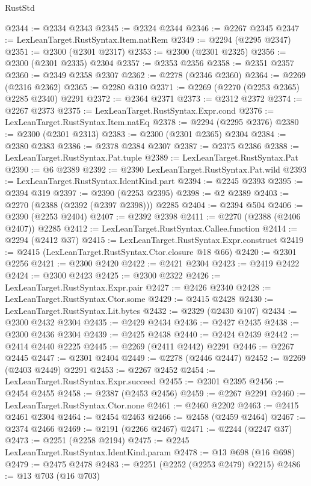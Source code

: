 \begin{lexlean}{RustStd}
\begin{coremodule}
{\begin{coremodule}
{{{{{{{{{{{{@2344 := @2334 @2343
@2345 := @2324 @2344
@2346 := @2267 @2345
@2347 := LexLeanTarget.RustSyntax.Item.natRem
@2349 := @2294 (@2295 @2347)
@2351 := @2300 (@2301 @2317)
@2353 := @2300 (@2301 @2325)
@2356 := @2300 (@2301 @2335) @2304
@2357 := @2353 @2356
@2358 := @2351 @2357
@2360 := @2349 @2358 @2307
@2362 := @2278 (@2346 @2360)
@2364 := @2269 (@2316 @2362)
@2365 := @2280 @310
@2371 := @2269 (@2270 (@2253 @2365) @2285 @2340) @2291
@2372 := @2364 @2371
@2373 := @2312 @2372
@2374 := @2267 @2373
@2375 := LexLeanTarget.RustSyntax.Expr.cond
@2376 := LexLeanTarget.RustSyntax.Item.natEq
@2378 := @2294 (@2295 @2376)
@2380 := @2300 (@2301 @2313)
@2383 := @2300 (@2301 @2365) @2304
@2384 := @2380 @2383
@2386 := @2378 @2384 @2307
@2387 := @2375 @2386
@2388 := LexLeanTarget.RustSyntax.Pat.tuple
@2389 := LexLeanTarget.RustSyntax.Pat
@2390 := @6 @2389
@2392 := @2390 LexLeanTarget.RustSyntax.Pat.wild
@2393 := LexLeanTarget.RustSyntax.IdentKind.part
@2394 := @2245 @2393
@2395 := @2394 @319
@2397 := @2390 (@2253 @2395)
@2398 := @2 @2389
@2403 := @2270 (@2388 (@2392 (@2397 @2398))) @2285
@2404 := @2394 @504
@2406 := @2390 (@2253 @2404)
@2407 := @2392 @2398
@2411 := @2270 (@2388 (@2406 @2407)) @2285
@2412 := LexLeanTarget.RustSyntax.Callee.function
@2414 := @2294 (@2412 @37)
@2415 := LexLeanTarget.RustSyntax.Expr.construct
@2419 := @2415 (LexLeanTarget.RustSyntax.Ctor.closure @18 @66)
@2420 := @2301 @2256
@2421 := @2300 @2420
@2422 := @2421 @2304
@2423 := @2419 @2422
@2424 := @2300 @2423
@2425 := @2300 @2322
@2426 := LexLeanTarget.RustSyntax.Expr.pair
@2427 := @2426 @2340
@2428 := LexLeanTarget.RustSyntax.Ctor.some
@2429 := @2415 @2428
@2430 := LexLeanTarget.RustSyntax.Lit.bytes
@2432 := @2329 (@2430 @107)
@2434 := @2300 @2432 @2304
@2435 := @2429 @2434
@2436 := @2427 @2435
@2438 := @2300 @2436 @2304
@2439 := @2425 @2438
@2440 := @2424 @2439
@2442 := @2414 @2440 @2225
@2445 := @2269 (@2411 @2442) @2291
@2446 := @2267 @2445
@2447 := @2301 @2404
@2449 := @2278 (@2446 @2447)
@2452 := @2269 (@2403 @2449) @2291
@2453 := @2267 @2452
@2454 := LexLeanTarget.RustSyntax.Expr.succeed
@2455 := @2301 @2395
@2456 := @2454 @2455
@2458 := @2387 (@2453 @2456)
@2459 := @2267 @2291
@2460 := LexLeanTarget.RustSyntax.Ctor.none
@2461 := @2460 @2202
@2463 := @2415 @2461 @2304
@2464 := @2454 @2463
@2466 := @2458 (@2459 @2464)
@2467 := @2374 @2466
@2469 := @2191 (@2266 @2467)
@2471 := @2244 (@2247 @37)
@2473 := @2251 (@2258 @2194)
@2475 := @2245 LexLeanTarget.RustSyntax.IdentKind.param
@2478 := @13 @698 (@16 @698)
@2479 := @2475 @2478
@2483 := @2251 (@2252 (@2253 @2479) @2215)
@2486 := @13 @703 (@16 @703)
}}}}}}}}}}}}
\end{coremodule}}
\end{coremodule}
\end{lexlean}
